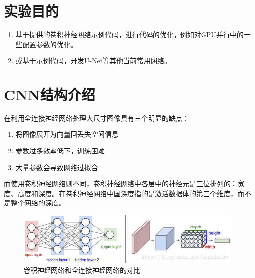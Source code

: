 \documentclass[UTF-8, a4paper, 12pt]{ctexart}
\title{\bfseries \Huge  }
\author{}
\date{}
\begin{document}




    
\setcounter{page}{1}
\tableofcontents
\listoffigures
\listoftables
\newpage
{} 
\setcounter{page}{1}        %



\section{实验目的}

\begin{enumerate}
    \item 基于提供的卷积神经网络示例代码，进行代码的优化，例如对GPU并行中的一些配置参数的优化。
    
    \item 或基于示例代码，开发U-Net等其他当前常用网络。 

\end{enumerate}


\section{CNN结构介绍}

在利用全连接神经网络处理大尺寸图像具有三个明显的缺点：
\begin{enumerate}
    \item 将图像展开为向量回丢失空间信息
    \item 参数过多效率低下，训练困难
    \item 大量参数会导致网络过拟合
\end{enumerate}

而使用卷积神经网络则不同，卷积神经网络中各层中的神经元是三位排列的：宽度、高度和深度。在卷积神经网络中国深度指的是激活数据体的第三个维度，而不是整个网络的深度。
\begin{figure}[htbp]
    \centering
    \includegraphics[width=15cm]{fig/f1.jpg}
    \caption{卷积神经网络和全连接神经网络的对比}
    \label{f1}
\end{figure}
\end{document}
